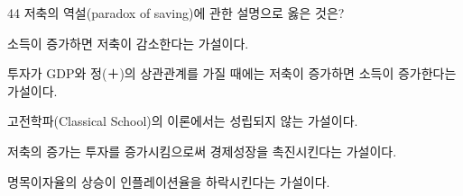 \begin{question}{44}
저축의 역설(paradox of saving)에 관한 설명으로 옳은 것은?
\begin{choices}
  \item 소득이 증가하면 저축이 감소한다는 가설이다.
  \item 투자가 GDP와 정(＋)의 상관관계를 가질 때에는 저축이 증가하면 소득이 증가한다는 가설이다.
  \item 고전학파(Classical School)의 이론에서는 성립되지 않는 가설이다.
  \item 저축의 증가는 투자를 증가시킴으로써 경제성장을 촉진시킨다는 가설이다.
  \item 명목이자율의 상승이 인플레이션율을 하락시킨다는 가설이다.
\end{choices}
\end{question}
